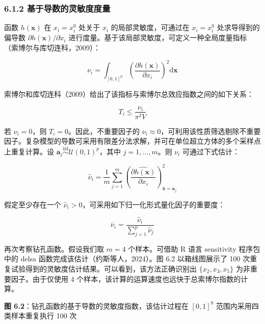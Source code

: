 \documentclass{ctexart}
\begin{document}
\subsubsection*{6.1.2 基于导数的灵敏度度量}

函数 $h(\boldsymbol{x})$ 在 $x_i=x_i^0$ 处关于 $x_i$ 的局部灵敏度，可通过在 $x_i=x_i^0$ 处求导得到的偏导数 $\partial h(\boldsymbol{x})/\partial x_i$ 进行度量。基于该局部灵敏度，可定义一种全局度量指标（索博尔与库切连科，2009）：

\begin{equation*}
\nu_i=\int_{[0,1]^p}\left(\frac{\partial h(\boldsymbol{x})}{\partial x_i}\right)^2\mathrm{d}\boldsymbol{x}
\tag{6.8}
\end{equation*}

索博尔和库切连科（2009）给出了该指标与索博尔总效应指数之间的如下关系：

\begin{equation*}
T_i \le \frac{\nu_i}{\pi^2 V}
\tag{6.9}
\end{equation*}

若 $\nu_i=0$，则 $T_i=0$。因此，不重要因子的 $\nu_i\approx0$，可利用该性质筛选剔除不重要因子。复杂模型的导数可采用有限差分法求解，并可在单位超立方体的多个采样点上重复计算。设 $\boldsymbol{a}_j \stackrel{\text{iid}}{\sim} \mathcal{U}(0,1)^p$，其中 $j=1,\dots,m$。则 $\nu_i$ 可通过下式估计：

\begin{equation*}
\widehat{\nu}_i=\frac{1}{m}\sum_{j=1}^{m}\left(\widehat{\frac{\partial h(\boldsymbol{x})}{\partial x_i}}\right)^2_{\boldsymbol{x}=\boldsymbol{a}_j}
\end{equation*}

假定至少存在一个 $\widehat{\nu}_i>0$，可采用如下归一化形式量化因子的重要度：

\begin{equation*}
\overline{\nu}_i=\frac{\widehat{\nu}_i}{\sum_{j=1}^{p}\widehat{\nu}_j}
\end{equation*}

再次考察钻孔函数。假设我们取 $m=4$ 个样本。可借助 R 语言 sensitivity 程序包中的 delsa 函数完成该估计（约斯等人，2024）。图 6.2 以箱线图展示了 100 次重复试验得到的灵敏度估计结果。可以看到，该方法正确识别出 $\{x_2,x_3,x_5\}$ 为非重要因子。由于仅使用 4 个样本，该计算的运算速度也远快于总索博尔指数的计算。

\begin{mdquote}
\textbf{图 6.2}：钻孔函数的基于导数的灵敏度指数，该估计过程在 $[0,1]^8$ 范围内采用四类样本重复执行 100 次
\end{mdquote}
\end{document}
